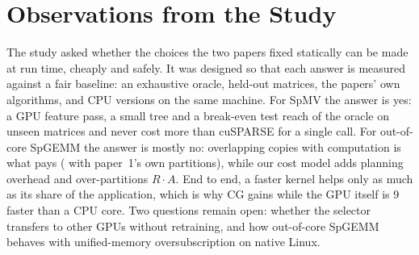 \section{Observations from the Study}\label{sec:observations}

The study asked whether the choices the two papers fixed statically can be made at run time, cheaply and safely.
It was designed so that each answer is measured against a fair baseline: an exhaustive oracle, held-out matrices,
the papers' own algorithms, and CPU versions on the same machine. For SpMV the answer is yes: a GPU feature pass, a
small tree and a break-even test reach \x{} of the oracle on unseen matrices and never cost more
than cuSPARSE for a single call. For out-of-core SpGEMM the answer is mostly no: overlapping copies with
computation is what pays (\x{} with paper~1's own partitions), while our cost model adds
planning overhead and over-partitions $R\cdot A$. End to end, a faster
kernel helps only as much as its share of the application, which is why CG gains \x{} while
the GPU itself is 9\x{} faster than a CPU core. Two questions remain open: whether the selector transfers to other
GPUs without retraining, and how out-of-core SpGEMM behaves with unified-memory oversubscription on native Linux.
